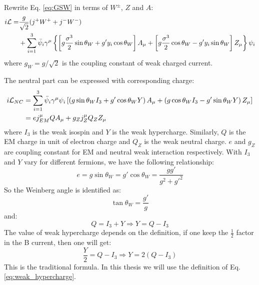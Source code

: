 Rewrite Eq. \ref{eq:GSW} in terms of $W^\pm$, $Z$ and $A$:
\begin{equation}
    \begin{aligned}
	i\mathcal{L} = &\frac{g}{\sqrt{2}}(j^+W^+ + j^-W^-)	\\
	    &+ \sum_{i=1}^3\bar{\psi}_i\gamma^\mu \left\{ 
		\left[g\frac{\sigma^3}{2}\sin\theta_W + g'y_i\cos\theta_W\right] A_\mu
		+ \left[ g\frac{\sigma^3}{2}\cos\theta_W - g'y_i\sin\theta_W \right] Z_\mu 
	    \right\} \psi_i
    \end{aligned}
\end{equation}
where $g_W = g/\sqrt{2}$ is the coupling constant of weak charged current.

The neutral part can be expressed with corresponding charge:
\begin{equation}
    \begin{aligned}
	i\mathcal{L}_{NC} &= \sum_{i=1}^{3} \bar{\psi}_i\gamma^\mu\psi_i
	\left[ 
	    \left(g\sin\theta_W I_3 + g'\cos\theta_W Y \right) A_\mu 
	    + \left(g\cos\theta_W I_3 - g'\sin\theta_W Y \right) Z_\mu 
	\right]	\\
	&= ej^\mu_{EM}QA_\mu + g_Zj^\mu_Z Q_Z Z_\mu \\
    \end{aligned}
\end{equation}
where $I_3$ is the weak isospin and $Y$ is the weak hypercharge. Similarly, $Q$ is
the EM charge in unit of electron charge and $Q_Z$ is the weak neutral charge.
$e$ and $g_Z$ are coupling constant for EM and neutral weak interaction respectively.
With $I_3$ and $Y$ vary for different fermions, we have the following relationship:
\begin{equation}
    e = g\sin\theta_W = g'\cos\theta_W = \frac{gg'}{g^2 + g'^2}
\end{equation}
So the Weinberg angle is identified as:
\begin{equation}
    \tan\theta_W = \frac{g'}{g}
\end{equation}
and: 
\begin{equation}
    Q = I_3 + Y	\Longrightarrow Y = Q - I_3
    \label{eq:weak_hypercharge}
\end{equation}
The value of weak hypercharge depends on the definition, if one keep the $\frac{1}{2}$
factor in the B current, then one will get:
\begin{equation}
    \frac{Y}{2} = Q - I_3   \Rightarrow Y = 2(Q-I_3)
\end{equation}
This is the traditional formula.
In this thesis we will use the definition of Eq. \ref{eq:weak_hypercharge}.


